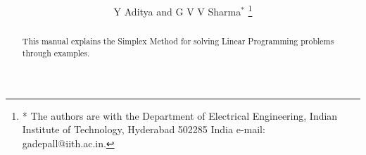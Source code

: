 \documentclass[journal,12pt,twocolumn]{IEEEtran}
\begin{document}
\let\StandardTheFigure\thefigure
\renewcommand{\thefigure}{\theproblem}


\def\putbox#1#2#3{\makebox[0in][l]{\makebox[#1][l]{}\raisebox{\baselineskip}[0in][0in]{\raisebox{#2}[0in][0in]{#3}}}}
     \def\rightbox#1{\makebox[0in][r]{#1}}
     \def\centbox#1{\makebox[0in]{#1}}
     \def\topbox#1{\raisebox{-\baselineskip}[0in][0in]{#1}}
     \def\midbox#1{\raisebox{-0.5\baselineskip}[0in][0in]{#1}}


\title{
}
\author{Y Aditya and G V V Sharma$^{*}$%
\thanks{* The authors are with the Department
of Electrical Engineering, Indian Institute of Technology, Hyderabad
502285 India e-mail:  gadepall@iith.ac.in.}%
}
%
\maketitle
%
\begin{abstract}
This manual explains the Simplex Method for solving Linear Programming problems through examples.
\end{abstract}
%
\end{document}
